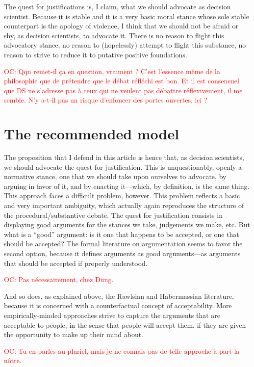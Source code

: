 \documentclass[preprint,11pt]{elsarticle}
\newcommand{\commentOC}[1]{\textcolor{red}{OC: #1}}
\begin{document}
The quest for justifications is, I claim, what we should advocate as decision scientist. Because it is stable and it is a very basic moral stance whose sole stable counterpart is the apology of violence, I think that we should not be afraid or shy, as decision scientists, to advocate it. There is no reason to flight this advocatory stance, no reason to (hopelessly) attempt to flight this substance, no reason to strive to reduce it to putative positive foundations.

\commentOC{Qqn remet-il ça en question,
vraiment ? C’est l’essence même de la philosophie que de
prétendre que le débat réfléchi est bon. Et il est consensuel
que DS ne s’adresse pas à ceux qui ne veulent pas débattre
réflexivement, il me semble. N’y a-t-il pas un risque
d’enfoncer des portes ouvertes, ici ?}

\section{The recommended model}
The proposition that I defend in this article is hence that, as decision scientists, we should advocate the quest for justification. This is unquestionably, openly a normative stance, one that we should take upon ourselves to advocate, by arguing in favor of it, and by enacting it—which, by definition, is the same thing.
This approach faces a difficult problem, however. This problem reflects a basic and very important ambiguity, which actually again reproduces the structure of the procedural/substantive debate. The quest for justification consists in displaying good arguments for the stances we take, judgements we make, etc. But what is a “good” argument: is it one that happens to be accepted, or one that should be accepted?
The formal literature on argumentation \cite{dung_acceptability_1995,besnard_elements_2008} seems to favor the second option, because it defines arguments as good arguments—as arguments that should be accepted if properly understood. 

\commentOC{Pas nécessairement, chez Dung.}

And so does, as explained above, the Rawlsian and Habermassian literature, because it is concerned with a counterfactual concept of acceptability. More empirically-minded approaches strive to capture the arguments that are acceptable to people, in the sense that people will accept them, if they are given the opportunity to make up their mind about.

\commentOC{Tu en parles au pluriel, mais je ne
connais pas de telle approche à part la nôtre.}
\end{document}
